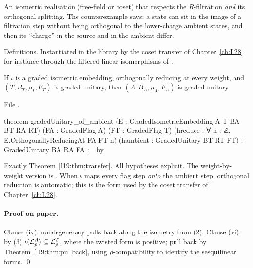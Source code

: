 \begin{physics}
An isometric realisation (free-field or coset) that respects the $R$-filtration \emph{and} its orthogonal splitting.
The counterexample says: a state can sit in the image of a filtration step without being orthogonal to the
lower-charge ambient states, and then its ``charge'' in the source and in the ambient differ.
\end{physics}

\begin{status}
Definitions. Instantiated in the library by the coset transfer of Chapter~\ref{ch:L28}, for instance through the
filtered linear isomorphisms of
\allowbreak{}\allowbreak{}.
\end{status}

\begin{theorem}\label{l19:thm:transfer}
If $\iota$ is a graded isometric embedding, orthogonally reducing at every weight, and $(T,B_T,\rho_T,F_T)$
is graded unitary, then $(A,B_A,\rho_A,F_A)$ is graded unitary.
\end{theorem}

\noindent File .
\begin{leancode}
theorem gradedUnitary_of_ambient
    (E : GradedIsometricEmbedding A T BA BT RA RT)
    (FA : GradedFlag A) (FT : GradedFlag T)
    (hreduce : ∀ n : ℤ, E.OrthogonallyReducingAt FA FT n)
    (hambient : GradedUnitary BT RT FT) :
    GradedUnitary BA RA FA := by
\end{leancode}

\begin{dictionary}
Exactly Theorem~\ref{l19:thm:transfer}. All hypotheses explicit.
The weight-by-weight version is \allowbreak{}\allowbreak{}. When $\iota$ maps
every flag step \emph{onto} the ambient step, orthogonal reduction is automatic; this is the form used by the coset
transfer of Chapter~\ref{ch:L28}.
\end{dictionary}

\paragraph{Proof on paper.} Clause (iv): nondegeneracy pulls back along the isometry from (2). Clause (vi): by (3)
$\iota(\mathcal{L}^A_p)\subseteq\mathcal{L}^T_p$, where the twisted form is positive; pull back by
Theorem~\ref{l19:thm:pullback}, using $\rho$-compatibility to identify the sesquilinear forms. \qed

